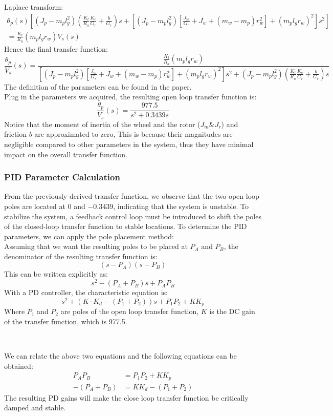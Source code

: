 \documentclass{article}
\begin{document}
Laplace transform:
\begin{multline*}
\theta_p(s) \left[ (J_p - m_p l_g^2) \left( \frac{K_t}{R_a} \frac{K_e}{G_r} + \frac{b}{G_r} \right) s + \left[ (J_p - m_p l_g^2) \left[ \frac{J_m}{G_r} + J_w + (m_w - m_p) r_w^2 \right] + (m_p l_g r_w)^2 \right] s^2 \right]
\\= \frac{K_t}{R_a} (m_p l_g r_w) V_s(s)
\end{multline*}
Hence the final transfer function:
\[
\frac{\theta_p}{V_s}(s) = \frac{\frac{K_t}{R_a} (m_p l_g r_w)}{\left[ (J_p - m_p l_g^2) \left[ \frac{J_m}{G_r} + J_w + (m_w - m_p) r_w^2 \right] + (m_p l_g r_w)^2 \right] s^2 + (J_p - m_p l_g^2) \left( \frac{K_t}{R_a} \frac{K_e}{G_r} + \frac{b}{G_r} \right) s}
\]
The definition of the parameters can be found in the paper. \\

Plug in the parameters we acquired, the resulting open loop transfer function is:
\[
\frac{\theta_p}{V_s}(s) = \frac{977.5}{s^2+0.3439s}
\]
Notice that the moment of inertia of the wheel and the rotor ($J_m \& J_r$) and
friction $b$ are approximated to zero, This is because their magnitudes are
negligible compared to other parameters in the system, thus they have
minimal impact on the overall transfer function.

\subsubsection{PID Parameter Calculation}

From the previously derived transfer function, we observe that the two open-loop
poles are located at $0$ and $-0.3439$, indicating that the system is unstable. To
stabilize the system, a feedback control loop must be introduced to shift the
poles of the closed-loop transfer function to stable locations. To determine the
PID parameters, we can apply the pole placement method: \\

Assuming that we want the resulting poles to be placed at $P_A$ and $P_B$, the
denominator of the resulting transfer function is:
\[
(s-P_A)(s-P_B)
\]
This can be written explicitly as:
\[
s^2 - (P_A + P_B)s + P_AP_B
\]
With a PD controller, the characteristic equation is:
\[
s^2 + (K \cdot K_d - (P_1 + P_2))s + P_1P_2 + KK_p
\]
Where $P_1$ and $P_2$ are poles of the open loop transfer function, $K$ is the
DC gain of the transfer function, which is 977.5.

\

We can relate the above two equations and the following equations can be obtained:
\begin{align*}
    P_AP_B &=  P_1P_2 + KK_p\\
    -(P_A + P_B) &= KK_d - (P_1 + P_2)
\end{align*}
The resulting PD gains will make the close loop transfer function be critically
damped and stable.
\end{document}
